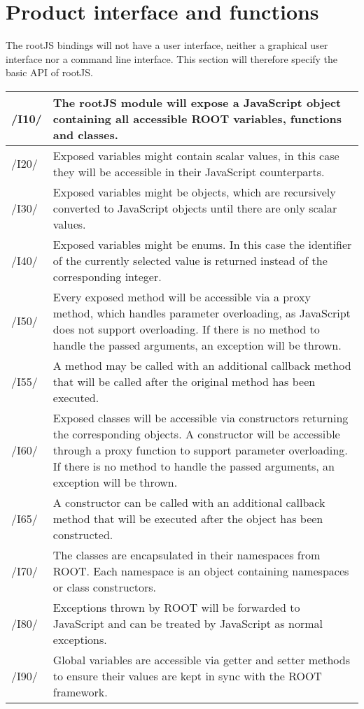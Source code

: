 \chapter{Product interface and functions}
The rootJS bindings will not have a user interface, neither a graphical user interface nor a command line interface.
This section will therefore specify the basic API of rootJS.


\begin{longtable}{|p{1cm} | p{15cm}|}
  \hline
  /I10/ & The rootJS module will expose a JavaScript object containing all accessible ROOT variables, functions and classes.\\
  \hline
  /I20/ & Exposed variables might contain scalar values, in this case they will be accessible in their JavaScript counterparts.\\
  \hline
  /I30/ & Exposed variables might be objects, which are recursively converted to JavaScript objects until there are only scalar values.\\
  \hline
  /I40/ & Exposed variables might be enums. In this case the identifier of the currently selected value is returned instead of the corresponding integer.\\
  \hline
  /I50/ & Every exposed method will be accessible via a proxy method, which handles parameter overloading, as JavaScript does not support overloading. If there is no method to handle the passed arguments, an exception will be thrown.\\
  \hline
  /I55/ & A method may be called with an additional callback method that will be called after the original method has been executed.\\
  \hline
  /I60/ & Exposed classes will be accessible via constructors returning the corresponding objects. A constructor will be accessible through a proxy function to support parameter overloading. If there is no method to handle the passed arguments, an exception will be thrown.\\
  \hline
  /I65/ & A constructor can be called with an additional callback method that will be executed after the object has been constructed.\\
  \hline
  /I70/ & The classes are encapsulated in their namespaces from ROOT. Each namespace is an object containing namespaces or class constructors.\\
  \hline
  /I80/ & Exceptions thrown by ROOT will be forwarded to JavaScript and can be treated by JavaScript as normal exceptions.\\
  \hline
  /I90/ & Global variables are accessible via getter and setter methods to ensure their values are kept in sync with the ROOT framework.\\
  \hline
\end{longtable}
